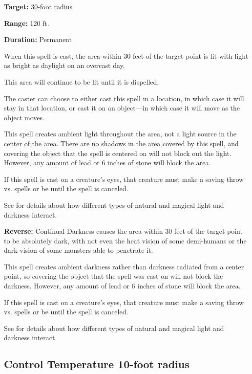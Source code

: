 \begin{multicols*}{2}
{\textbf{Target:} 30-foot radius

\textbf{Range:} 120 ft.

\textbf{Duration:} Permanent}

When this spell is cast, the area within 30 feet of the target point is lit with light as bright as daylight on an overcast day.

This area will continue to be lit until it is dispelled.

The caster can choose to either cast this spell in a location, in which case it will stay in that location, or cast it on an object—in which case it will move as the object moves.

This spell creates ambient light throughout the area, not a light source in the center of the area. There are no shadows in the area covered by this spell, and covering the object that the spell is centered on will not block out the light. However, any amount of lead or 6 inches of stone will block the area.

If this spell is cast on a creature’s eyes, that creature must make a saving throw vs. spells or be  until the spell is canceled.

See  for details about how different types of natural and magical light and darkness interact.

\textbf{Reverse:} \hypertarget{spell:Continual Darkness}{Continual Darkness} causes the area within 30 feet of the target point to be absolutely dark, with not even the heat vision of some demi-humans or the dark vision of some monsters able to penetrate it.

This spell creates ambient darkness rather than darkness radiated from a center point, so covering the object that the spell was cast on will not block the darkness. However, any amount of lead or 6 inches of stone will block the area.

If this spell is cast on a creature’s eyes, that creature must make a saving throw vs. spells or be  until the spell is canceled.

See  for details about how different types of natural and magical light and darkness interact.

\subsection{Control Temperature 10-foot radius}\label{spell:Control Temperature 10-foot radius}
\end{multicols*}
